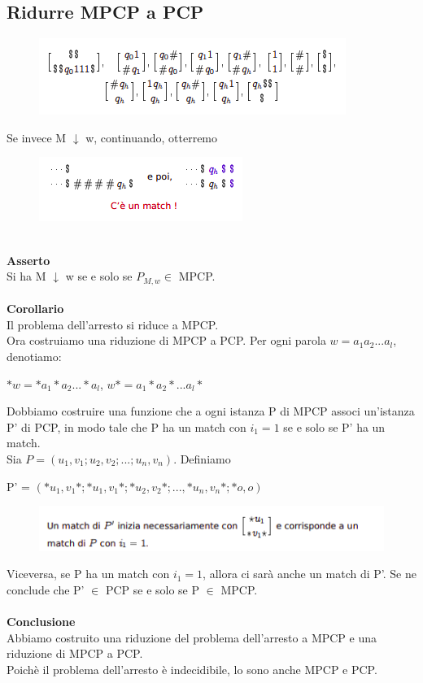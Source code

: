 \subsection{Ridurre MPCP a PCP}
\begin{figure}[htp]
    \centering
    \includegraphics[scale=0.9]{tesi_stile/img/cap7f13.png}
\end{figure}
Se invece M $\downarrow$ w, continuando, otterremo\\
\begin{figure}[htp]
    \centering
    \includegraphics[scale=0.9]{tesi_stile/img/cap7f14.png}
\end{figure}\\
\textbf{Asserto}\\
Si ha M $\downarrow$ w se e solo se $P_{M,w} \in$ MPCP.\\\\
\textbf{Corollario}\\
Il problema dell’arresto si riduce a MPCP.\\
Ora costruiamo una riduzione di MPCP a PCP. Per ogni parola $w =a_1a_2 ... a_l$, denotiamo:
\begin{center}
    $*w = *a_1 *a_2 ... *a_l$,  $w*=a_1* a_2* ... a_l*$
\end{center}
Dobbiamo costruire una funzione che a ogni istanza P di MPCP associ un'istanza P' di PCP, in modo tale che P ha un match con $i_1 = 1$ se e solo se P' ha un match.\\
Sia $P = (u_1, v_1; u_2, v_2;...;u_n,v_n)$. Definiamo\\
\begin{center}
   P' = $(*u_1,v_1*; *u_1, v_1*;*u_2, v_2*; ... , *u_n, v_n*; *o, o)$
\end{center}
\newpage
\begin{figure}[htp]
    \includegraphics[scale=0.9]{tesi_stile/img/cap7f16.png}
\end{figure}
Viceversa, se P ha un match con $i_1 = 1$, allora ci sarà anche un match di P'.
Se ne conclude che P' $\in$ PCP se e solo se P $\in$ MPCP.\\\\
\textbf{Conclusione}\\
Abbiamo costruito una riduzione del problema dell’arresto a MPCP e una riduzione di MPCP a PCP.\\
Poichè il problema dell’arresto è indecidibile, lo sono anche MPCP e PCP.
